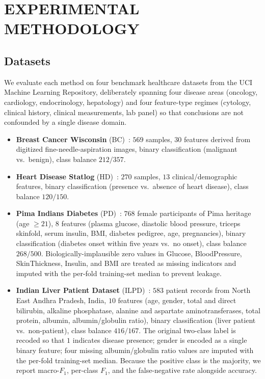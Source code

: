 \documentclass[letterpaper, 10 pt, conference]{ieeeconf}
\begin{document}
\section{EXPERIMENTAL METHODOLOGY}
\label{sec:methodology}

\subsection{Datasets}

We evaluate each method on four benchmark healthcare datasets from the UCI Machine Learning Repository, deliberately spanning four disease areas (oncology, cardiology, endocrinology, hepatology) and four feature-type regimes (cytology, clinical history, clinical measurements, lab panel) so that conclusions are not confounded by a single disease domain.
\begin{itemize}
	\item \textbf{Breast Cancer Wisconsin} (BC)~\cite{dua2019uci}: $569$ samples, $30$ features derived from digitized fine-needle-aspiration images, binary classification (malignant vs.\ benign), class balance $212/357$.
	\item \textbf{Heart Disease Statlog} (HD)~\cite{dua2019uci}: $270$ samples, $13$ clinical/demographic features, binary classification (presence vs.\ absence of heart disease), class balance $120/150$.
	\item \textbf{Pima Indians Diabetes} (PD)~\cite{smith1988pima, dua2019uci}: $768$ female participants of Pima heritage (age $\geq 21$), $8$ features (plasma glucose, diastolic blood pressure, triceps skinfold, serum insulin, BMI, diabetes pedigree, age, pregnancies), binary classification (diabetes onset within five years vs.\ no onset), class balance $268/500$. Biologically-implausible zero values in Glucose, BloodPressure, SkinThickness, Insulin, and BMI are treated as missing indicators and imputed with the per-fold training-set median to prevent leakage.
	\item \textbf{Indian Liver Patient Dataset} (ILPD)~\cite{ramana2011ilpd, dua2019uci}: $583$ patient records from North East Andhra Pradesh, India, $10$ features (age, gender, total and direct bilirubin, alkaline phosphatase, alanine and aspartate aminotransferases, total protein, albumin, albumin/globulin ratio), binary classification (liver patient vs.\ non-patient), class balance $416/167$. The original two-class label is recoded so that $1$ indicates disease presence; gender is encoded as a single binary feature; four missing albumin/globulin ratio values are imputed with the per-fold training-set median. Because the positive class is the majority, we report macro-$F_1$, per-class $F_1$, and the false-negative rate alongside accuracy.
\end{itemize}
\end{document}
